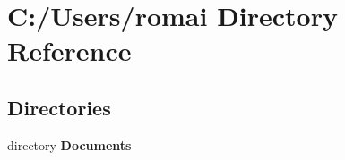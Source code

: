 \section{C\+:/\+Users/romai Directory Reference}
\label{dir_749558d503dc94f7de714407d9fafa09}
\subsection*{Directories}
\begin{DoxyCompactItemize}
\item 
directory \textbf{ Documents}
\end{DoxyCompactItemize}
